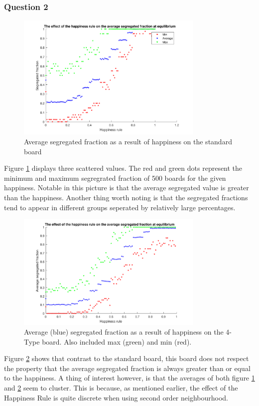 \subsubsection{Question 2}
\begin{figure}[H]
    \centering
    \includegraphics[width=0.8\textwidth]{habysegfrac_sb_2}
    \caption{Average segregated fraction as a result of happiness on the standard board}
    \label{fig:happysegsb}
\end{figure}

Figure \ref{fig:happysegsb} displays three scattered values. The red and green dots represent the minimum and maximum segregrated fraction of 500 boards for the given happiness. Notable in this picture is that the average segregated value is greater than the happiness. 
Another thing worth noting is that the segregated fractions tend to appear in different groups seperated by relatively large percentages.
\begin{figure}[H]
    \centering
    \includegraphics[width=0.8\textwidth]{habysegfrac_4b_2}
    \caption{Average (blue) segregated fraction as a result of happiness on the 4-Type board. Also included max (green) and min (red).}
    \label{fig:happyseg4b}
\end{figure}
Figure \ref{fig:happyseg4b} shows that contrast to the standard board, this board does not respect the property that the average segregated fraction is always greater than or equal to the happiness. 
A thing of interest however, is that the averages of both figure \ref{fig:happysegsb} and \ref{fig:happyseg4b} seem to cluster. This is because, as mentioned earlier, the effect of the Happiness Rule is quite discrete when using second order neighbourhood.
